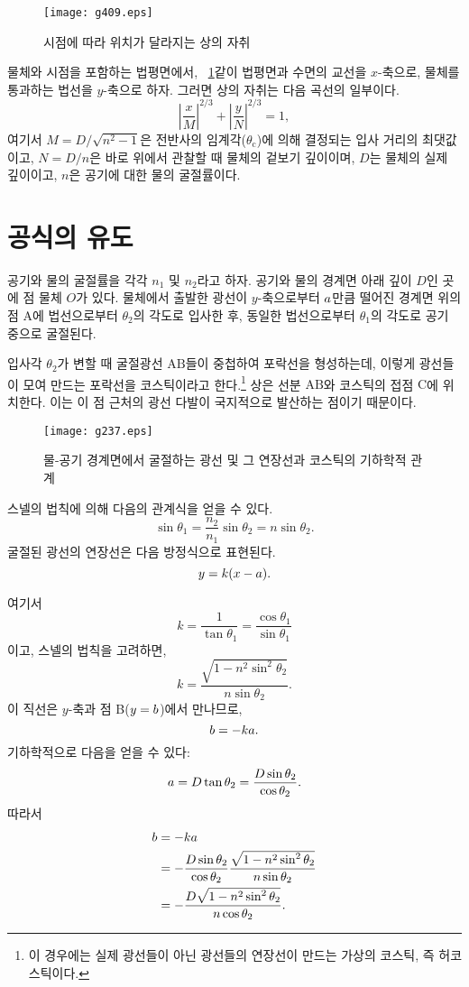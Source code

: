 \documentclass[twocolumn]{article}
\begin{document}
\begin{figure}
	\centering
	\texttt{[image: g409.eps]} \hfill\null
	\caption{시점에 따라 위치가 달라지는 상의 자취}
	\label{fig:caustic}
\end{figure}

물체와 시점을 포함하는 법평면에서, \figurename\ \ref{fig:caustic}\과 같이 법평면과 수면의 교선을 $x$-축으로, 
물체를 통과하는 법선을 $y$-축으로 하자. 그러면 상의 자취는 다음 곡선의 일부이다.
	$$ \left| \dfrac{x}{M} \right| ^ {2/3} 
	+ \left| \dfrac{y}{N} \right| ^ {2/3} = 1,$$
여기서 $M = D/\sqrt{n^2 - 1}$은 전반사의 임계각($\theta_{\mathrm{c}}$)에 의해 결정되는 입사 거리의 최댓값이고, 
$N = D/n$은 바로 위에서 관찰할 때 물체의 겉보기 깊이이며, 
$D$는 물체의 실제 깊이이고, $n$은 공기에 대한 물의 굴절률이다.
	
\section{공식의 유도}
	
공기와 물의 굴절률을 각각 $n_1$ 및 $n_2$라고 하자. 공기와 물의 경계면 아래 깊이 $D$인 곳에 점 물체 $O$가 있다. 
물체에서 출발한 광선이 $y$-축으로부터 ${a}$만큼 떨어진 경계면 위의 점 A에 
법선으로부터 $\theta_2$의 각도로 입사한 후, 동일한 법선으로부터 $\theta_1$의 각도로 공기 중으로 굴절된다.

입사각 $\theta_2$가 변할 때 굴절광선 ${\mathrm{AB}}$들이 중첩하여 포락선을 형성하는데, 이렇게 광선들이 모여 만드는 포락선을 코스틱이라고 한다.\footnote{이 경우에는 실제 광선들이 아닌 광선들의 연장선이 만드는 가상의 코스틱, 즉 허코스틱이다.} 상은 선분 ${\mathrm{AB}}$와 코스틱의 접점 $\mathrm{C}$에 위치한다. 
이는 이 점 근처의 광선 다발이 국지적으로 발산하는 점이기 때문이다. 

\begin{figure}
	\centering
	\texttt{[image: g237.eps]}
	\caption{물-공기 경계면에서 굴절하는 광선 및 그 연장선과 코스틱의 기하학적 관계}
	\label{fig:geometry}
\end{figure}


스넬의 법칙에 의해 다음의 관계식을 얻을 수 있다.
$$ \sin\theta_1 = \frac{n_2}{n_1} \sin\theta_2 = n\sin\theta_2.$$
굴절된 광선의 연장선은 다음 방정식으로 표현된다.
$$y=k(x-{a}).$$

여기서 
$$k=\dfrac{1}{\tan\theta_1}=\dfrac{\cos\theta_1}{\sin\theta_1}$$
이고, 스넬의 법칙을 고려하면,
$$k=\dfrac{\sqrt{1-n^2\sin^2\theta_2}}{n\sin\theta_2}.$$
이 직선은 $y$-축과 점 B($y={b}$)에서 만나므로,
$${b} = -k{a}.$$
기하학적으로 다음을 얻을 수 있다:
$${a} = D\tan\theta_2 = \dfrac{D\sin\theta_2}{\cos\theta_2}.$$
따라서
$$\begin{aligned}
	{b} &= -k{a} \\
	&= -\dfrac{D\sin\theta_2}{\cos\theta_2}
	\dfrac{\sqrt{1-n^2\sin^2\theta_2}}{n\sin\theta_2}\\
	&=-\dfrac{D\sqrt{1-n^2\sin^2\theta_2}}{n\cos\theta_2}.
\end{aligned}$$
\end{document}
